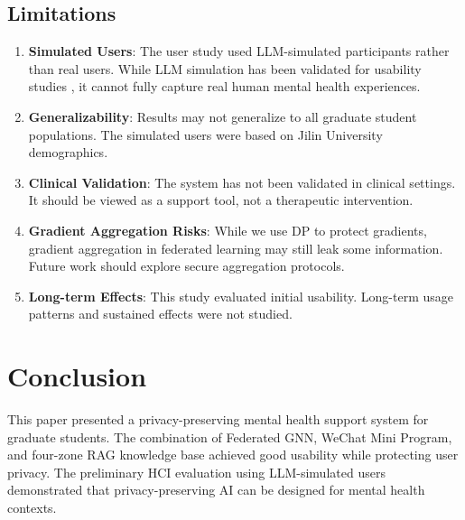 \documentclass[preprint,12pt]{elsarticle}
\begin{document}
\subsection{Limitations}
\label{sec:limitations}

\begin{enumerate}
    \item \textbf{Simulated Users}: The user study used LLM-simulated participants
          rather than real users. While LLM simulation has been validated for
          usability studies \citep{horton2023llm}, it cannot fully capture real
          human mental health experiences.

    \item \textbf{Generalizability}: Results may not generalize to all graduate
          student populations. The simulated users were based on Jilin University
          demographics.

    \item \textbf{Clinical Validation}: The system has not been validated in
          clinical settings. It should be viewed as a support tool, not a
          therapeutic intervention.

    \item \textbf{Gradient Aggregation Risks}: While we use DP to protect gradients,
          gradient aggregation in federated learning may still leak some information.
          Future work should explore secure aggregation protocols.

    \item \textbf{Long-term Effects}: This study evaluated initial usability.
          Long-term usage patterns and sustained effects were not studied.
\end{enumerate}

\section{Conclusion}

This paper presented a privacy-preserving mental health support system for
graduate students. The combination of Federated GNN, WeChat Mini Program,
and four-zone RAG knowledge base achieved good usability while protecting
user privacy. The preliminary HCI evaluation using LLM-simulated users
demonstrated that privacy-preserving AI can be designed for mental health contexts.
\end{document}
